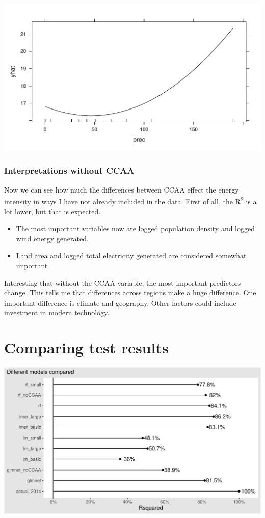 \documentclass[
]{report}
\providecommand{\tightlist}{%
  \setlength{\itemsep}{0pt}\setlength{\parskip}{0pt}}\usepackage{longtable,booktabs,array}
\begin{document}
\includegraphics{Modelling_Energy_Intensity-V3_files/figure-pdf/unnamed-chunk-13-5.pdf}

\hypertarget{interpretations-without-ccaa}{%
\subsubsection{Interpretations without
CCAA}\label{interpretations-without-ccaa}}

Now we can see how much the differences between CCAA effect the energy
intensity in ways I have not already included in the data. First of all,
the R\textsuperscript{2} is a lot lower, but that is expected.

\begin{itemize}
\tightlist
\item
  The most important variables now are logged population density and
  logged wind energy generated.
\item
  Land area and logged total electricity generated are considered
  somewhat important
\end{itemize}

Interesting that without the CCAA variable, the most important
predictors change. This tells me that differences across regions make a
huge difference. One important difference is climate and geography.
Other factors could include investment in modern technology.

\hypertarget{comparing-test-results}{%
\section{Comparing test results}\label{comparing-test-results}}

\includegraphics{Modelling_Energy_Intensity-V3_files/figure-pdf/unnamed-chunk-15-1.pdf}
\end{document}
